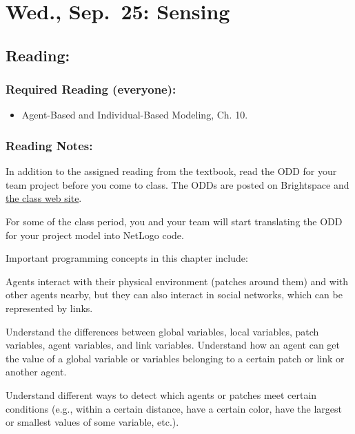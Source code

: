 \documentclass[
]{article}
\providecommand{\tightlist}{%
  \setlength{\itemsep}{0pt}\setlength{\parskip}{0pt}}
\begin{document}
\section{Wed., Sep.~25: Sensing}\label{wed.-sep.-25-sensing}

\subsection{Reading:}\label{reading-10}

\subsubsection{Required Reading
(everyone):}\label{required-reading-everyone-9}

\begin{itemize}
\tightlist
\item
  Agent-Based and Individual-Based Modeling, Ch. 10.
\end{itemize}

\subsubsection{Reading Notes:}\label{reading-notes-9}

In addition to the assigned reading from the textbook, read the ODD for
your team project before you come to class. The ODDs are posted on
Brightspace and \href{/projects/}{the class web site}.

For some of the class period, you and your team will start translating
the ODD for your project model into NetLogo code.

Important programming concepts in this chapter include:

\begin{description}
\tightlist
\item[Links:]
Agents interact with their physical environment (patches around them)
and with other agents nearby, but they can also interact in social
networks, which can be represented by links.
\item[Variable scope:]
Understand the differences between global variables, local variables,
patch variables, agent variables, and link variables. Understand how an
agent can get the value of a global variable or variables belonging to a
certain patch or link or another agent.
\item[Entity detection:]
Understand different ways to detect which agents or patches meet certain
conditions (e.g., within a certain distance, have a certain color, have
the largest or smallest values of some variable, etc.).
\end{description}
\end{document}
